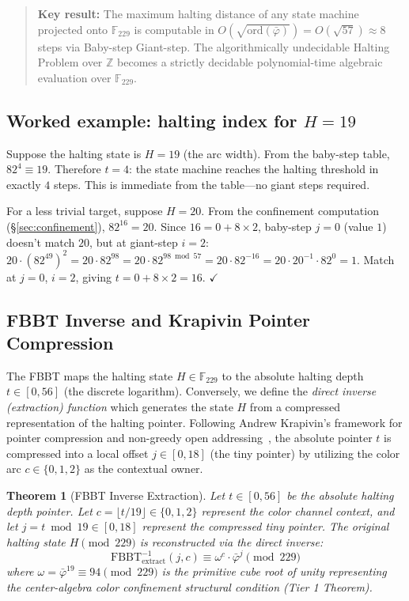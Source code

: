 \documentclass[12pt,oneside]{article}
\theoremstyle{principia}
\newtheorem{theorem}{Theorem}[section]
\theoremstyle{definition}
\theoremstyle{remark}
\begin{document}
\begin{quote}
\textbf{Key result:} The maximum halting distance of any state
machine projected onto $\mathbb{F}_{229}$ is computable in
$O(\sqrt{\mathrm{ord}(\bar\varphi)}) = O(\sqrt{57}) \approx 8$
steps via Baby-step Giant-step. The algorithmically undecidable
Halting Problem over $\mathbb{Z}$ becomes a strictly decidable
polynomial-time algebraic evaluation over $\mathbb{F}_{229}$.
\end{quote}

\subsection{Worked example: halting index for $H = 19$}

Suppose the halting state is $H = 19$ (the arc width). From
the baby-step table, $82^4 \equiv 19$. Therefore $t = 4$: the
state machine reaches the halting threshold in exactly $4$ steps.
This is immediate from the table---no giant steps required.

For a less trivial target, suppose $H = 20$. From the
confinement computation (\S\ref{sec:confinement}), $82^{16} = 20$.
Since $16 = 0 + 8 \times 2$, baby-step $j = 0$ (value $1$) doesn't
match $20$, but at giant-step $i = 2$: $20 \cdot (82^{49})^2
= 20 \cdot 82^{98} = 20 \cdot 82^{98 \bmod 57} = 20 \cdot 82^{-16}
= 20 \cdot 20^{-1} \cdot 82^0 = 1$. Match at $j = 0$, $i = 2$,
giving $t = 0 + 8 \times 2 = 16$. $\checkmark$

\subsection{FBBT Inverse and Krapivin Pointer Compression}
\label{subsec:fbbt_inverse_krapivin}

The FBBT maps the halting state $H \in \mathbb{F}_{229}$ to the absolute halting depth $t \in [0, 56]$ (the discrete logarithm). Conversely, we define the \emph{direct inverse (extraction) function} which generates the state $H$ from a compressed representation of the halting pointer. Following Andrew Krapivin's framework for pointer compression and non-greedy open addressing~\cite{krapivin2025optimal}, the absolute pointer $t$ is compressed into a local offset $j \in [0, 18]$ (the tiny pointer) by utilizing the color arc $c \in \{0, 1, 2\}$ as the contextual owner.

\begin{theorem}[FBBT Inverse Extraction]
\label{thm:fbbt_inverse_extract}
Let $t \in [0, 56]$ be the absolute halting depth pointer. Let $c = \lfloor t / 19 \rfloor \in \{0, 1, 2\}$ represent the color channel context, and let $j = t \bmod 19 \in [0, 18]$ represent the compressed tiny pointer. The original halting state $H \pmod{229}$ is reconstructed via the direct inverse:
\[
\mathrm{FBBT}^{-1}_{\mathrm{extract}}(j, c) \equiv \omega^c \cdot \bar\varphi^j \pmod{229}
\]
where $\omega = \bar\varphi^{19} \equiv 94 \pmod{229}$ is the primitive cube root of unity representing the center-algebra color confinement structural condition (Tier 1 Theorem).
\end{theorem}
\end{document}
